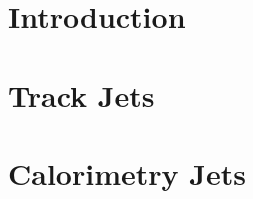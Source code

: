 \documentclass[12pt,twoside]{article}
\begin{document}
\linenumbers
\pagestyle{empty}




\setcounter{page}{1}



\tableofcontents


\renewcommand{\thepage}{\arabic{page}}

\section {Introduction}
\label{ECCE plots analysis}


\section {Track Jets}
\label{section2}



\section{Calorimetry Jets}
\label{calo_jets}

\listoftodos[To Do]



\end{document}
